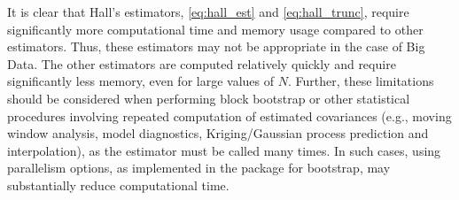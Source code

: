 It is clear that Hall's estimators, \eqref{eq:hall_est} and \eqref{eq:hall_trunc}, require significantly more computational time and memory usage compared to other estimators. Thus, these estimators may not be appropriate in the case of Big Data. The other estimators are computed relatively quickly and require significantly less memory, even for large values of \(N.\) Further, these limitations should be considered when performing block bootstrap or other statistical procedures involving repeated computation of estimated covariances (e.g., moving window analysis, model diagnostics, Kriging/Gaussian process prediction and interpolation), as the estimator must be called many times. In such cases, using parallelism options, as implemented in the package for bootstrap, may substantially reduce computational time.



